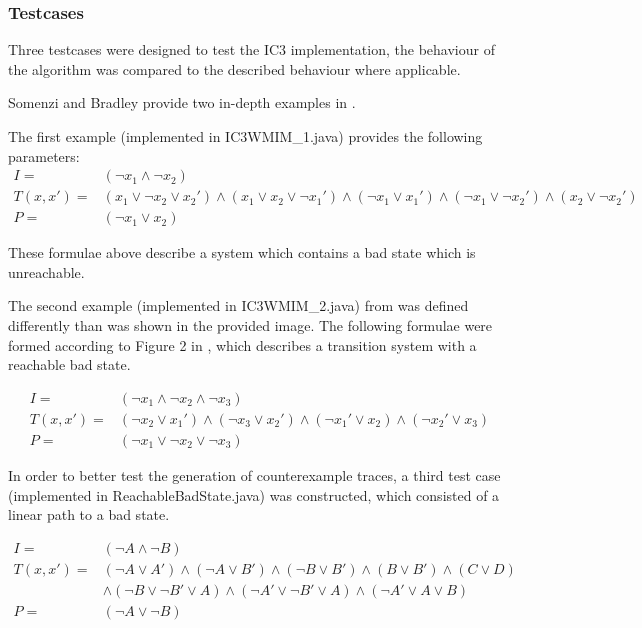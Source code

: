 \documentclass[a4paper]{article}
\begin{document}
\subsubsection{Testcases}
\label{sec:ic3_testcases}
Three testcases were designed to test the IC3 implementation, the behaviour of the algorithm was compared to the described behaviour where applicable.

Somenzi and Bradley provide two in-depth examples in \cite{Somenzi2011}.

The first example (implemented in IC3WMIM\_1.java) provides the following parameters:
\begin{align*}
I =& (\lnot x_1 \land \lnot x_2)\\
T(x,x') =& (x_1 \lor \lnot x_2 \lor x_2') \land (x_1 \lor x_2 \lor \lnot x_1') \land (\lnot x_1 \lor x_1') \land (\lnot x_1 \lor \lnot x_2') \land (x_2 \lor \lnot x_2') \\
P =& (\lnot x_1 \lor x_2)
\end{align*}

These formulae above describe a system which contains a bad state which is unreachable.

The second example (implemented in IC3WMIM\_2.java) from \cite{Somenzi2011} was defined differently than was shown in the provided image.
The following formulae were formed according to Figure 2 in \cite{Somenzi2011}, which describes a transition system with a reachable bad state.

\begin{align*}
I =& (\lnot x_1 \land \lnot x_2 \land \lnot x_3)\\
T(x,x') =& (\lnot x_2 \lor x_1') \land (\lnot x_3 \lor x_2') \land (\lnot x_1' \lor x_2) \land (\lnot x_2' \lor x_3)\\
P =& (\lnot x_1 \lor \lnot x_2 \lor \lnot x_3)
\end{align*}

In order to better test the generation of counterexample traces, a third test case (implemented in ReachableBadState.java) was constructed, which consisted of a linear path to a bad state.

\begin{align*}
I =& (\lnot A \land \lnot B)\\
T(x,x') =& (\lnot A \lor A') \land (\lnot A \lor B') \land (\lnot B \lor B') \land (B \lor B') \land (C \lor D)\\
&\land (\lnot B \lor \lnot B' \lor A) \land (\lnot A' \lor \lnot B' \lor A) \land (\lnot A' \lor A \lor B)\\
P =& (\lnot A \lor \lnot B)
\end{align*}
\end{document}
